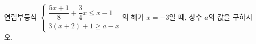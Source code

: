 연립부등식 $\begin{cases} \dfrac{5x+1}{8}+\dfrac{3}{4}x\le x-1 \\ 3(x+2)+1\ge a-x \end{cases}$의 해가 $x=-3$일 때, 상수 $a$의 값을 구하시오.
